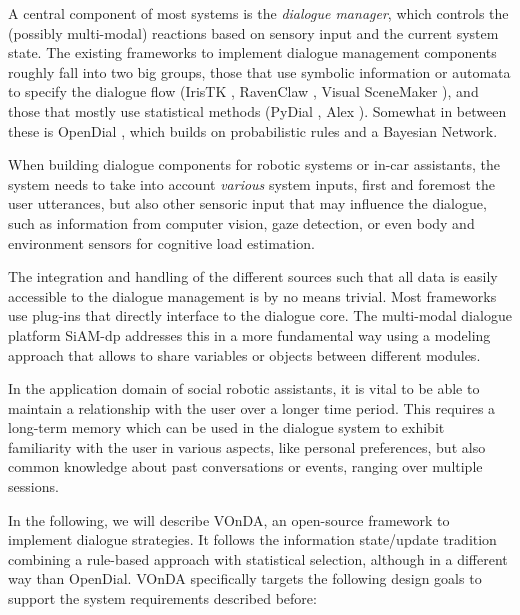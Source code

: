 \documentclass[a4paper]{report}
\newcommand{\vonda}{VOnDA\xspace}
\begin{document}
A central component of most systems is the \emph{dialogue manager}, which
controls the (possibly multi-modal) reactions based on sensory input and the
current system state. The existing frameworks to implement dialogue management
components roughly fall into two big groups, those that use symbolic
information or automata to specify the dialogue flow (IrisTK
\citep{2012iristk}, RavenClaw \citep{bohus2009ravenclaw}, Visual SceneMaker
\citep{gebhard2012visual}), and those that mostly use statistical methods
(PyDial \cite{ultes2017pydial}, Alex \citep{jurvcivcek2014alex}). Somewhat in
between these is OpenDial \citep{lison2015developing}, which builds on
probabilistic rules and a Bayesian Network.

When building dialogue components for robotic systems or in-car assistants, the system
needs to take into account \emph{various} system inputs, first and foremost the
user utterances, but also other sensoric input that may influence the dialogue,
such as information from computer vision, gaze detection, or even body and
environment sensors for cognitive load estimation.

The integration and handling of the different sources such that all data is
easily accessible to the dialogue management is by no means trivial. Most
frameworks use plug-ins that directly interface to the dialogue core. The
multi-modal dialogue platform SiAM-dp \citep{nesselrath2014siam}
addresses this in a more fundamental way using a modeling approach that allows
to share variables or objects between different modules.

In the application domain of social robotic assistants, it is vital to be able
to maintain a relationship with the user over a longer time period. This requires a long-term
memory which can be used in the dialogue system to exhibit familiarity with the
user in various aspects, like personal preferences, but also common knowledge
about past conversations or events, ranging over multiple sessions.

In the following, we will describe \vonda, an open-source framework to
implement dialogue strategies. It follows the information state/update
tradition \citep{traum2003information}
combining a rule-based approach with statistical selection, although in a
different way than OpenDial. \vonda specifically targets the following design
goals to support the system requirements described before:
\end{document}
